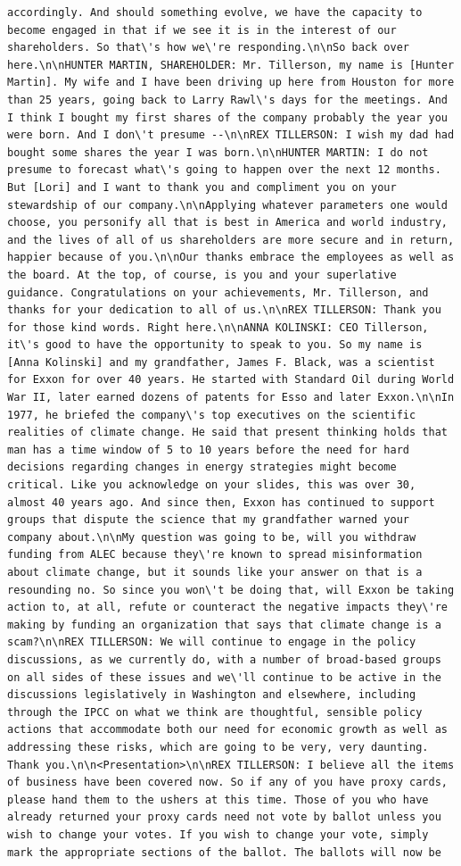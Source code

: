 \documentclass[
  letterpaper,
  DIV=11,
  numbers=noendperiod]{scrreprt}
\begin{document}
\begin{verbatim}
accordingly. And should something evolve, we have the capacity to become engaged in that if we see it is in the interest of our shareholders. So that\'s how we\'re responding.\n\nSo back over here.\n\nHUNTER MARTIN, SHAREHOLDER: Mr. Tillerson, my name is [Hunter Martin]. My wife and I have been driving up here from Houston for more than 25 years, going back to Larry Rawl\'s days for the meetings. And I think I bought my first shares of the company probably the year you were born. And I don\'t presume --\n\nREX TILLERSON: I wish my dad had bought some shares the year I was born.\n\nHUNTER MARTIN: I do not presume to forecast what\'s going to happen over the next 12 months. But [Lori] and I want to thank you and compliment you on your stewardship of our company.\n\nApplying whatever parameters one would choose, you personify all that is best in America and world industry, and the lives of all of us shareholders are more secure and in return, happier because of you.\n\nOur thanks embrace the employees as well as the board. At the top, of course, is you and your superlative guidance. Congratulations on your achievements, Mr. Tillerson, and thanks for your dedication to all of us.\n\nREX TILLERSON: Thank you for those kind words. Right here.\n\nANNA KOLINSKI: CEO Tillerson, it\'s good to have the opportunity to speak to you. So my name is [Anna Kolinski] and my grandfather, James F. Black, was a scientist for Exxon for over 40 years. He started with Standard Oil during World War II, later earned dozens of patents for Esso and later Exxon.\n\nIn 1977, he briefed the company\'s top executives on the scientific realities of climate change. He said that present thinking holds that man has a time window of 5 to 10 years before the need for hard decisions regarding changes in energy strategies might become critical. Like you acknowledge on your slides, this was over 30, almost 40 years ago. And since then, Exxon has continued to support groups that dispute the science that my grandfather warned your company about.\n\nMy question was going to be, will you withdraw funding from ALEC because they\'re known to spread misinformation about climate change, but it sounds like your answer on that is a resounding no. So since you won\'t be doing that, will Exxon be taking action to, at all, refute or counteract the negative impacts they\'re making by funding an organization that says that climate change is a scam?\n\nREX TILLERSON: We will continue to engage in the policy discussions, as we currently do, with a number of broad-based groups on all sides of these issues and we\'ll continue to be active in the discussions legislatively in Washington and elsewhere, including through the IPCC on what we think are thoughtful, sensible policy actions that accommodate both our need for economic growth as well as addressing these risks, which are going to be very, very daunting. Thank you.\n\n<Presentation>\n\nREX TILLERSON: I believe all the items of business have been covered now. So if any of you have proxy cards, please hand them to the ushers at this time. Those of you who have already returned your proxy cards need not vote by ballot unless you wish to change your votes. If you wish to change your vote, simply mark the appropriate sections of the ballot. The ballots will now be 
\end{verbatim}
\end{document}
